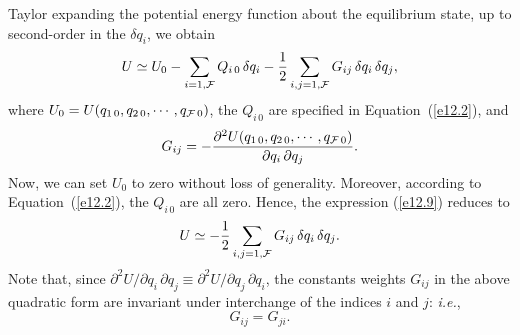 Taylor expanding the potential energy function about the equilibrium state, up to second-order in the $\delta q_i$, we obtain
\begin{equation}\label{e12.9}
U \simeq U_0 - \sum_{i=1,{\cal F}} Q_{i\,0}\,\delta q_i - \frac{1}{2}\sum_{i,j=1,{\cal F}} G_{ij}\,\delta q_i \,\delta q_j,
\end{equation}
where $U_0=U(q_{1\,0},q_{2\,0},\cdots, q_{{\cal F}\,0})$, the $Q_{i\,0}$
are specified in Equation~(\ref{e12.2}), and
\begin{equation}\label{e12.10}
G_{ij} = -\frac{\partial^2 U(q_{1\,0},q_{2\,0},\cdots, q_{{\cal F}\,0})}{\partial q_i\,\partial q_j}.
\end{equation}
Now, we can set $U_0$ to zero without loss of generality. Moreover, according to Equation~(\ref{e12.2}), the
$Q_{i\,0}$ are all zero. Hence, the  expression (\ref{e12.9}) reduces to
\begin{equation}\label{e12.11}
U \simeq  - \frac{1}{2}\sum_{i,j=1,{\cal F}} G_{ij}\,\delta q_i \,\delta q_j.
\end{equation}
Note that, since $\partial^2 U/\partial q_i\,\partial q_j\equiv
\partial^2 U/\partial q_j\,\partial q_i$, the constants weights $G_{ij}$  in the
above quadratic form are invariant under interchange of the indices $i$ and $j$: {\em i.e.},
\begin{equation}\label{e12.12}
G_{ij} = G_{ji}.
\end{equation}

